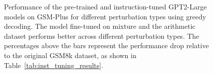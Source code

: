 \begin{figure}[t]
    \centering
    \resizebox{\linewidth}{!}{
        \Large\ttfamily
        
    }
    \caption{Performance of the pre-trained and instruction-tuned GPT2-Large models on GSM-Plus for different perturbation types using greedy decoding. The model fine-tuned on \tulu{} mixture and the arithmetic dataset performs better across different perturbation types. The percentages above the bars represent the performance drop relative to the original GSM8k dataset, as shown in Table~\ref{tab:inst_tuning_results}.}
    \label{fig:gsm_plus_accuracy_greedy}
\end{figure}
